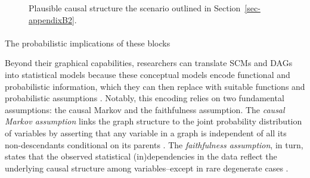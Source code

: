 \documentclass[
  authoryear,
  review,
  1p]{elsarticle}
\makeatletter
\let\oldparagraph\paragraph
\renewcommand{\paragraph}{
    \@ifstar
      \xxxParagraphStar
      \xxxParagraphNoStar
  }
\newcommand{\xxxParagraphStar}[1]{\oldparagraph*{#1}\mbox{}}
\newcommand{\xxxParagraphNoStar}[1]{\oldparagraph{#1}\mbox{}}
\makeatother
\begin{document}
\begin{figure}

\begin{minipage}{0.50\linewidth}

\centering{

\[
\begin{aligned}
  X & := f_{X}(e_{X}) \\
  T & := f_{T}(X,e_{T}) \\
  Y & := f_{Y}(T,X,e_{Y}) \\
  e_{T} & \:\bot\:e_{X} \\
  e_{T} & \:\bot\:e_{Y} \\
  e_{X} & \:\bot\:e_{Y}
\end{aligned}
\]

}


\end{minipage}%
%
\begin{minipage}{0.50\linewidth}



\end{minipage}%

\caption{\label{fig-example1}Plausible causal structure the scenario
outlined in Section~\ref{sec-appendixB2}.}

\end{figure}%

\paragraph{The probabilistic implications of these
blocks}\label{sec-appendixB32}

Beyond their graphical capabilities, researchers can translate SCMs and
DAGs into statistical models because these conceptual models encode
functional and probabilistic information, which they can then replace
with suitable functions and probabilistic assumptions
\citep{Pearl_et_al_2016}. Notably, this encoding relies on two
fundamental assumptions: the causal Markov and the faithfulness
assumption. The \emph{causal Markov assumption} links the graph
structure to the joint probability distribution of variables by
asserting that any variable in a graph is independent of all its
non-descendants conditional on its parents
\citetext{\citealp[pp.~20]{Neal_2020}; \citealp[pp.~80]{Hernan_et_al_2025}}.
The \emph{faithfulness assumption}, in turn, states that the observed
statistical (in)dependencies in the data reflect the underlying causal
structure among variables--except in rare degenerate cases
\citetext{\citealp[pp.~100]{Neal_2020}; \citealp[pp.~81]{Hernan_et_al_2025}}.
\end{document}
